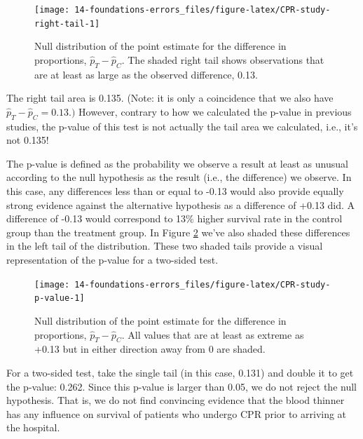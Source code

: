 \documentclass[
  10pt,
  openany]{book}
\begin{document}
\begin{figure}[h]

{\centering \texttt{[image: 14-foundations-errors\_files/figure-latex/CPR-study-right-tail-1]} 

}

\caption{Null distribution of the point estimate for the difference in proportions, $\hat{p}_T - \hat{p}_C.$ The shaded right tail shows observations that are at least as large as the observed difference, 0.13.}\label{fig:CPR-study-right-tail}
\end{figure}

The right tail area is 0.135.
(Note: it is only a coincidence that we also have \(\hat{p}_T - \hat{p}_C=0.13.)\) However, contrary to how we calculated the p-value in previous studies, the p-value of this test is not actually the tail area we calculated, i.e., it's not 0.135!

The p-value is defined as the probability we observe a result at least as unusual according to the null hypothesis as the result (i.e., the difference) we observe.
In this case, any differences less than or equal to -0.13 would also provide equally strong evidence against the alternative hypothesis as a difference of +0.13 did.
A difference of -0.13 would correspond to 13\% higher survival rate in the control group than the treatment group.
In Figure \ref{fig:CPR-study-p-value} we've also shaded these differences in the left tail of the distribution.
These two shaded tails provide a visual representation of the p-value for a two-sided test.

\begin{figure}[h]

{\centering \texttt{[image: 14-foundations-errors\_files/figure-latex/CPR-study-p-value-1]} 

}

\caption{Null distribution of the point estimate for the difference in proportions, $\hat{p}_T - \hat{p}_C.$ All values that are at least as extreme as +0.13 but in either direction away from 0 are shaded.}\label{fig:CPR-study-p-value}
\end{figure}

For a two-sided test, take the single tail (in this case, 0.131) and double it to get the p-value: 0.262.
Since this p-value is larger than 0.05, we do not reject the null hypothesis.
That is, we do not find convincing evidence that the blood thinner has any influence on survival of patients who undergo CPR prior to arriving at the hospital.
\end{document}
